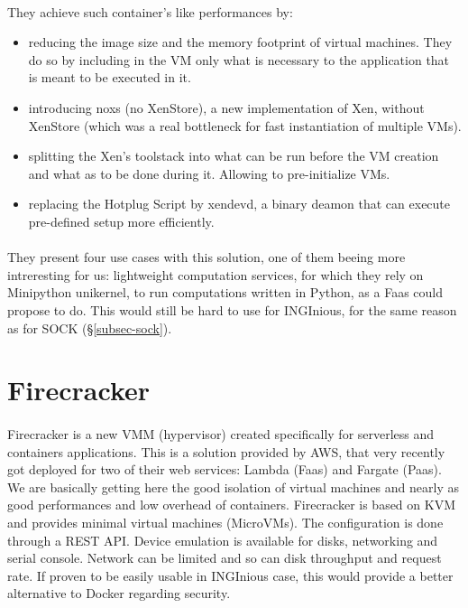 \paragraph{}They achieve such container's like performances by:
\begin{itemize}
\renewcommand\labelitemi{--}
  \item reducing the image size and the memory footprint of virtual machines.  They do so by including in the VM only what is necessary to the application that is meant to be executed in it.
  \item introducing noxs (no XenStore), a new implementation of Xen, without XenStore (which was a real bottleneck for fast instantiation of multiple VMs).
  \item splitting the Xen's toolstack into what can be run before the VM creation and what as to be done during it.  Allowing to pre-initialize VMs.
  \item replacing the Hotplug Script by xendevd, a binary deamon that can execute pre-defined setup more efficiently.
\end{itemize}

\paragraph{}They present four use cases with this solution, one of them beeing more intreresting for us: lightweight computation services, for which they rely on Minipython unikernel, to run computations written in Python, as a Faas could propose to do.  This would still be hard to use for INGInious, for the same reason as for SOCK (§\ref{subsec-sock}).

\section{Firecracker} 
\paragraph{} Firecracker is a new VMM (hypervisor) created specifically for serverless and containers applications.  \cite{agachefirecracker}  This is a solution provided by AWS, that very recently got deployed for two of their web services: Lambda (Faas) and Fargate (Paas).  We are basically getting here the good isolation of virtual machines and nearly as good performances and low overhead of containers.  Firecracker is based on KVM and provides minimal virtual machines (MicroVMs).  The configuration is done through a REST API.  Device emulation is available for disks, networking and serial console.  Network can be limited and so can disk throughput and request rate.  If proven to be easily usable in INGInious case, this would provide a better alternative to Docker regarding security.

